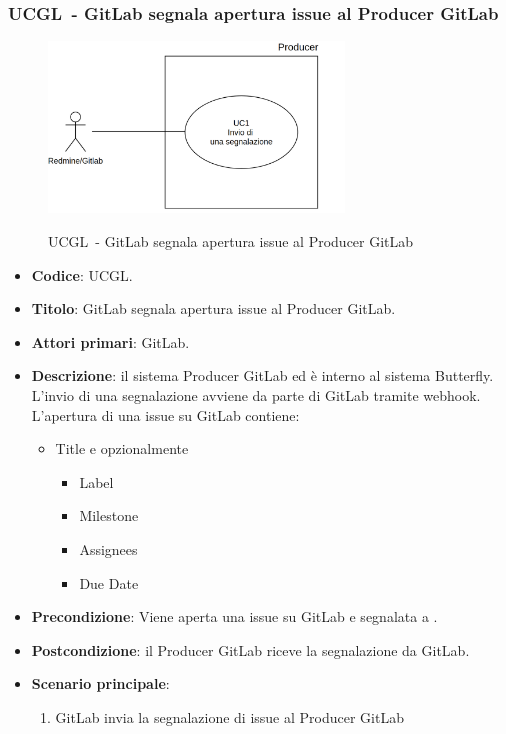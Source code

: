 \subsubsection{UCGL\theuccount\ - GitLab segnala apertura issue al Producer GitLab}
	\begin{figure}[H]
		\centering
		\includegraphics[width=0.7\textwidth]{img/UC1.png}\\
		\caption{UCGL\theuccount\ - GitLab segnala apertura issue al Producer GitLab}
	\end{figure}
	\begin{itemize}
		\item \textbf{Codice}: UCGL\theuccount.
		\item \textbf{Titolo}: GitLab segnala apertura issue al Producer GitLab.
		\item \textbf{Attori primari}: GitLab.
		\item \textbf{Descrizione}:
		il sistema Producer GitLab ed è interno al sistema Butterfly. L'invio di
		una segnalazione avviene da parte di GitLab tramite webhook. L'apertura di
		una issue su GitLab contiene:
		\begin{itemize}
			\item Title e opzionalmente
			\begin{itemize}
				\item Label
				\item Milestone
				\item Assignees
				\item Due Date
			\end{itemize}
		\end{itemize}
		\item \textbf{Precondizione}: Viene aperta una issue su GitLab e 
		segnalata a \progetto.
		\item \textbf{Postcondizione}: il Producer GitLab riceve la segnalazione da GitLab.
		\item \textbf{Scenario principale}: 
		\begin{enumerate}
			\item GitLab invia la segnalazione di issue al Producer GitLab
		\end{enumerate}
		
	\end{itemize}
	
